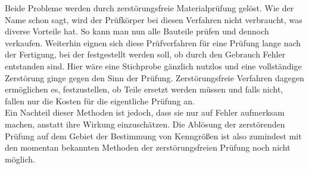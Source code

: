 \documentclass[reducespace,stylepage,semiarbeit]{spezidoc}
\begin{document}
Beide Probleme werden durch zerstörungsfreie Materialprüfung gelöst. 
Wie der Name schon sagt, wird der Prüfkörper bei diesen Verfahren nicht verbraucht, was diverse Vorteile hat. 
So kann man nun alle Bauteile prüfen und dennoch verkaufen. 
Weiterhin  eignen sich diese Prüfverfahren für eine Prüfung lange nach der Fertigung, bei der festgestellt werden soll, ob durch den Gebrauch Fehler entstanden sind. 
Hier wäre eine Stichprobe gänzlich nutzlos und eine vollständige Zerstörung ginge gegen den Sinn der Prüfung. 
Zerstörungsfreie Verfahren dagegen ermöglichen es, festzustellen, ob Teile ersetzt werden müssen und falls nicht, fallen nur die Kosten für die eigentliche Prüfung an.\\
Ein Nachteil dieser Methoden ist jedoch, dass sie nur auf Fehler aufmerksam machen, anstatt ihre Wirkung einzuschätzen. 
Die Ablösung der zerstörenden Prüfung auf dem Gebiet der Bestimmung von Kenngrößen ist also zumindest mit den momentan bekannten Methoden der zerstörungsfreien Prüfung noch nicht möglich.
\end{document}
